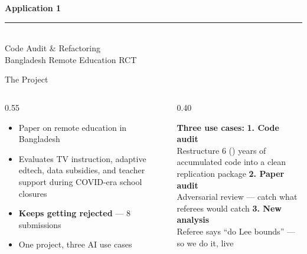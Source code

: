\documentclass[aspectratio=169, 10pt]{beamer}
\begin{document}
{
\begin{frame}
\end{frame}
}

{
\begin{frame}
\centering\vfill
{\fontsize{22}{28}\bfseries\selectfont\color{white} Application 1}\\[6pt]
{\color{UVMGold}\rule{5cm}{0.8pt}}\\[6pt]
{\normalsize\color{UVMGold} Code Audit \& Refactoring}\\[4pt]
{\small\color{PaleSage} Bangladesh Remote Education RCT}
\vfill
\end{frame}
}

\begin{frame}{The Project}
\begin{columns}[T]
\begin{column}{0.55\textwidth}
\vskip4pt
\begin{itemize}\setlength{\itemsep}{6pt}
  \item Paper on remote education in Bangladesh
  \item Evaluates TV instruction, adaptive edtech, data subsidies, and teacher support during COVID-era school closures
  \item \textbf{Keeps getting rejected} --- 8 submissions \faTired[regular]
  \item One project, three AI use cases
\end{itemize}
\end{column}
\begin{column}{0.40\textwidth}
\begin{tcolorbox}[accentbox]
\small
\textbf{Three use cases:}
\vskip4pt
\textbf{1. Code audit}\\
Restructure 6 (\faSadCry[regular]) years of accumulated code into a clean replication package
\vskip4pt
\textbf{2. Paper audit}\\
Adversarial review --- catch what referees would catch
\vskip4pt
\textbf{3. New analysis}\\
Referee says ``do Lee bounds'' --- so we do it, live
\end{tcolorbox}
\end{column}
\end{columns}
\end{frame}
\end{document}
